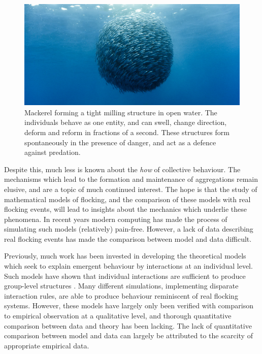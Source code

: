 \begin{figure}[t]
  \includegraphics[width=\textwidth]{milling.jpg}
  \caption{Mackerel forming a tight milling structure in open water. The
    individuals behave as one entity, and can swell, change direction,
    deform and reform in fractions of a second. These structures form
    spontaneously in the presence of danger, and act as a defence against
    predation.}
  \label{fig:milling}
\end{figure}

Despite this, much less is known about the \emph{how} of collective behaviour.
The mechanisms which lead to the formation and maintenance of aggregations
remain elusive, and are a topic of much continued interest. The hope is that
the study of mathematical models of flocking, and the comparison of these
models with real flocking events, will lead to insights about the mechanics
which underlie these phenomena. In recent years modern computing has made the
process of simulating such models (relatively) pain-free. However, a lack of
data describing real flocking events has made the comparison between model and
data difficult.

Previously, much work has been invested in developing the theoretical models
which seek to explain emergent behaviour by interactions at an individual
level. Such models have shown that individual interactions are sufficient to
produce group-level structures \parencite{aoki82}. Many different simulations,
implementing disparate interaction rules, are able to produce behaviour
reminiscent of real flocking systems. However, these models have largely only
been verified with comparison to empirical observation at a qualitative level,
and thorough quantitative comparison between data and theory has been lacking.
The lack of quantitative comparison between model and data can largely be
attributed to the scarcity of appropriate empirical data.

